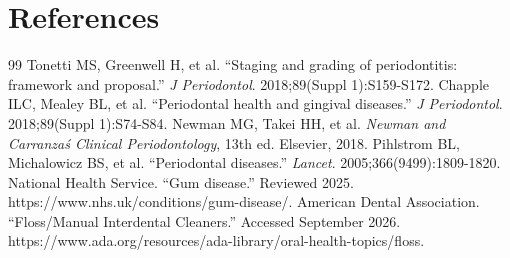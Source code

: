\section*{References}
\begin{thebibliography}{99}
 Tonetti MS, Greenwell H, et al. ``Staging and grading of periodontitis: framework and proposal.'' \textit{J Periodontol}. 2018;89(Suppl 1):S159-S172.
 Chapple ILC, Mealey BL, et al. ``Periodontal health and gingival diseases.'' \textit{J Periodontol}. 2018;89(Suppl 1):S74-S84.
 Newman MG, Takei HH, et al. \textit{Newman and Carranza\'s Clinical Periodontology}, 13th ed. Elsevier, 2018.
 Pihlstrom BL, Michalowicz BS, et al. ``Periodontal diseases.'' \textit{Lancet}. 2005;366(9499):1809-1820.
 National Health Service. ``Gum disease.'' Reviewed 2025. https://www.nhs.uk/conditions/gum-disease/.
 American Dental Association. ``Floss/Manual Interdental Cleaners.'' Accessed September 2026. https://www.ada.org/resources/ada-library/oral-health-topics/floss.
\end{thebibliography}
